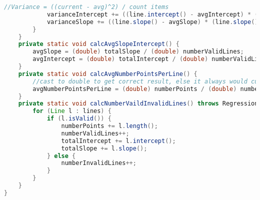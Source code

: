 \begin{lstlisting}[language=java,
    label=lst:ls,
    caption=LineStatistics holds all statistics correspondign to the whole set of Lines
]
			//Variance = ((current - avg)^2) / count items
			varianceIntercept += ((line.intercept() - avgIntercept) * (line.intercept() - avgIntercept))/ (double) numberValidLines;
			varianceSlope += ((line.slope() - avgSlope) * (line.slope() - avgSlope))/ (double) numberValidLines;
		}
	}
	private static void calcAvgSlopeIntercept() {
		avgSlope = (double) totalSlope / (double) numberValidLines;
		avgIntercept = (double) totalIntercept / (double) numberValidLines;
	}
	private static void calcAvgNumberPointsPerLine() {
		//cast to double to get correct result, else it always would cut off floating points
		avgNumberPointsPerLine = (double) numberPoints / (double) numberValidLines;
	}
	private static void calcNumberVaildInvalidLines() throws RegressionFailedException {
		for (Line l : lines) {
			if (l.isValid()) {
				numberPoints += l.length();
				numberValidLines++;
				totalIntercept += l.intercept();
				totalSlope += l.slope();
			} else {
				numberInvalidLines++;
			}
		}
	}	
}
\end{lstlisting}